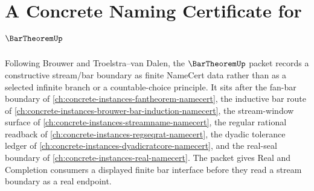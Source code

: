 \chapter{A Concrete Naming Certificate for $\BarTheoremUp$}
\label{ch:concrete-instances-bar-theorem-namecert}

Following Brouwer and Troelstra--van Dalen, the $\BarTheoremUp$ packet records a constructive stream/bar boundary as finite NameCert data rather than as a selected infinite branch or a countable-choice principle. It sits after the fan-bar boundary of \autoref{ch:concrete-instances-fantheorem-namecert}, the inductive bar route of \autoref{ch:concrete-instances-brouwer-bar-induction-namecert}, the stream-window surface of \autoref{ch:concrete-instances-streamname-namecert}, the regular rational readback of \autoref{ch:concrete-instances-regseqrat-namecert}, the dyadic tolerance ledger of \autoref{ch:concrete-instances-dyadicratcore-namecert}, and the real-seal boundary of \autoref{ch:concrete-instances-real-namecert}. The packet gives Real and Completion consumers a displayed finite bar interface before they read a stream boundary as a real endpoint.

